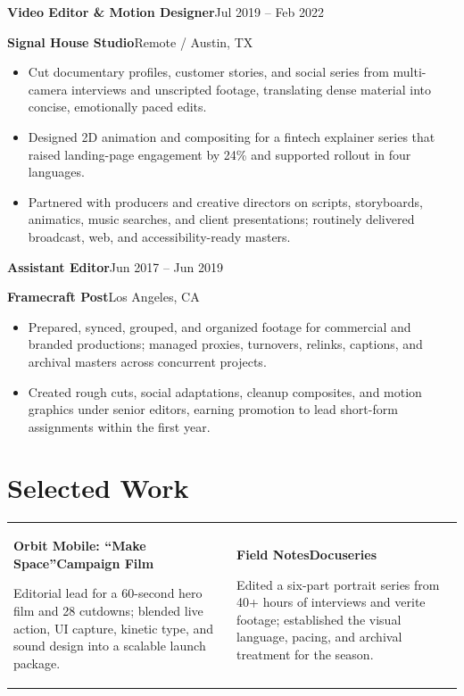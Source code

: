 \documentclass[10pt,letterpaper]{article}
\newcommand{\job}[4]{%
  \textbf{\color{ink}#1}\hfill{\small\color{slate}#4}\par
  {\color{accent}\textbf{#2}}{\color{slate}\enspace\textbar\enspace #3}\par
}
\newcommand{\project}[3]{%
  \textbf{\color{ink}#1}\hfill{\small\color{accent}\textbf{#2}}\par
  {\small\color{slate}#3}\par
}
\begin{document}
\vspace{2pt}
\job{Video Editor \& Motion Designer}{Signal House Studio}{Remote / Austin, TX}{Jul 2019 -- Feb 2022}
\begin{itemize}
  \item Cut documentary profiles, customer stories, and social series from multi-camera interviews and unscripted footage, translating dense material into concise, emotionally paced edits.
  \item Designed 2D animation and compositing for a fintech explainer series that raised landing-page engagement by 24\% and supported rollout in four languages.
  \item Partnered with producers and creative directors on scripts, storyboards, animatics, music searches, and client presentations; routinely delivered broadcast, web, and accessibility-ready masters.
\end{itemize}

\vspace{2pt}
\job{Assistant Editor}{Framecraft Post}{Los Angeles, CA}{Jun 2017 -- Jun 2019}
\begin{itemize}
  \item Prepared, synced, grouped, and organized footage for commercial and branded productions; managed proxies, turnovers, relinks, captions, and archival masters across concurrent projects.
  \item Created rough cuts, social adaptations, cleanup composites, and motion graphics under senior editors, earning promotion to lead short-form assignments within the first year.
\end{itemize}

\section{Selected Work}

\begin{tabularx}{\linewidth}{@{}X@{\hspace{14pt}}X@{}}
  \project{Orbit Mobile: ``Make Space''}{Campaign Film}{Editorial lead for a 60-second hero film and 28 cutdowns; blended live action, UI capture, kinetic type, and sound design into a scalable launch package.}
  &
  \project{Field Notes}{Docuseries}{Edited a six-part portrait series from 40+ hours of interviews and verite footage; established the visual language, pacing, and archival treatment for the season.}
\end{tabularx}
\end{document}
